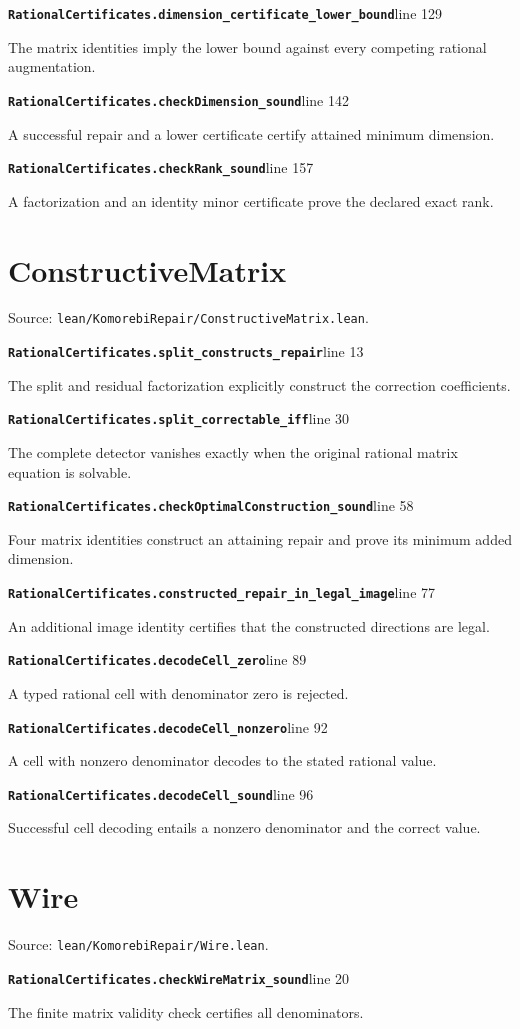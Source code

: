 \documentclass[11pt,letterpaper,oneside,openany]{book}
\theoremstyle{quiet}
\newcommand{\record}[3]{\noindent\begin{minipage}{\linewidth}\small\textbf{\nolinkurl{#1}}\hfill\textsf{line #2}\par\smallskip #3\end{minipage}\par\vspace{7pt}}
\begin{document}
\record{RationalCertificates.dimension_certificate_lower_bound}{129}{The matrix identities imply the lower bound against every competing rational augmentation.}

\record{RationalCertificates.checkDimension_sound}{142}{A successful repair and a lower certificate certify attained minimum dimension.}

\record{RationalCertificates.checkRank_sound}{157}{A factorization and an identity minor certificate prove the declared exact rank.}

\section{ConstructiveMatrix}

Source: \nolinkurl{lean/KomorebiRepair/ConstructiveMatrix.lean}.

\record{RationalCertificates.split_constructs_repair}{13}{The split and residual factorization explicitly construct the correction coefficients.}

\record{RationalCertificates.split_correctable_iff}{30}{The complete detector vanishes exactly when the original rational matrix equation is solvable.}

\record{RationalCertificates.checkOptimalConstruction_sound}{58}{Four matrix identities construct an attaining repair and prove its minimum added dimension.}

\record{RationalCertificates.constructed_repair_in_legal_image}{77}{An additional image identity certifies that the constructed directions are legal.}

\record{RationalCertificates.decodeCell_zero}{89}{A typed rational cell with denominator zero is rejected.}

\record{RationalCertificates.decodeCell_nonzero}{92}{A cell with nonzero denominator decodes to the stated rational value.}

\record{RationalCertificates.decodeCell_sound}{96}{Successful cell decoding entails a nonzero denominator and the correct value.}

\section{Wire}

Source: \nolinkurl{lean/KomorebiRepair/Wire.lean}.

\record{RationalCertificates.checkWireMatrix_sound}{20}{The finite matrix validity check certifies all denominators.}
\end{document}
